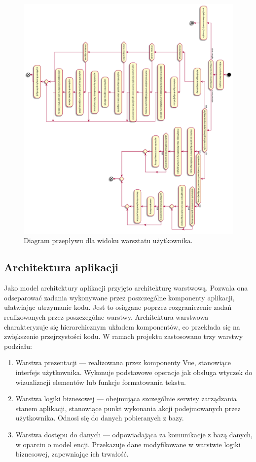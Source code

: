 \begin{figure}[H]
	\begin{center}
		\includegraphics[scale=0.39]{media/UserFlowWorkshop90.png}
	\end{center}
	\caption{Diagram przepływu dla widoku warsztatu użytkownika.}
	\label{rys:flow-workshop}
\end{figure}

\subsection{Architektura aplikacji}
Jako model architektury aplikacji przyjęto architekturę warstwową. Pozwala ona odseparować zadania wykonywane przez
poszczególne komponenty aplikacji, ułatwiając utrzymanie kodu. Jest to osiągane poprzez rozgraniczenie zadań
realizowanych przez poszczególne warstwy. Architektura warstwowa charakteryzuje się hierarchicznym układem komponentów,
co przekłada się na zwiększenie przejrzystości kodu. W ramach projektu zastosowano trzy warstwy podziału:

\begin{enumerate}
	\item Warstwa prezentacji — realizowana przez komponenty Vue, stanowiące interfejs użytkownika. Wykonuje podstawowe operacje
	      jak obsługa wtyczek do wizualizacji elementów lub funkcje formatowania tekstu.
	\item Warstwa logiki biznesowej — obejmująca szczególnie serwisy zarządzania stanem aplikacji, stanowiące punkt wykonania
	      akcji podejmowanych przez użytkownika. Odnosi się do danych pobieranych z bazy.
	\item Warstwa dostępu do danych — odpowiadająca za komunikacje z bazą danych, w oparciu o model encji. Przekazuje
	      dane modyfikowane w warstwie logiki biznesowej, zapewniając ich trwałość.
\end{enumerate}

